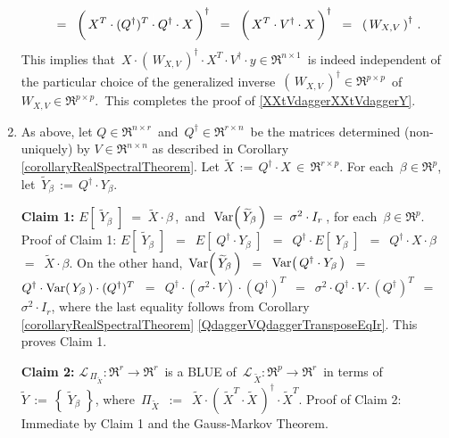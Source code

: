 \begin{enumerate}
\begin{equation*}
	\;\; = \;\;
	\left(\,X^{T} \cdot (Q^{\dagger})^{T} \overset{{\color{white}\vert}}{\cdot} Q^{\dagger} \cdot X\,\right)^{\dagger}
	\;\; = \;\;
	\left(\,X^{T} \overset{{\color{white}\vert}}{\cdot} V^{\dagger} \cdot X\,\right)^{\dagger}
	\;\; = \;\;
	\left(\,W_{X,V}\,\right)^{\dagger}\,.
	\end{equation*}
	This implies that
	\,$X \cdot \left(\,W_{X,V}\,\right)^{\dagger} \cdot X^{T} \cdot V^{\dagger} \cdot y \in \Re^{n \times 1}$\,
	is indeed independent of the particular choice of the generalized inverse
	\,$\left(\,W_{X,V}\,\right)^{\dagger} \in \Re^{p \times p}$\,
	of \,$W_{X,V} \in \Re^{p \times p}$.\,
	This completes the proof of \eqref{XXtVdaggerXXtVdaggerY}.
\item
	As above, let $Q \in \Re^{n \times r}$\, and \,$Q^{\dagger} \in \Re^{r \times n}$\,
	be the matrices determined (non-uniquely) by $V \in \Re^{n \times n}$
	as described in Corollary \ref{corollaryRealSpectralTheorem}.
	Let $\widetilde{X} \,:=\, Q^{\dagger} \cdot X \,\in\, \Re^{r \times p}$.
	For each \,$\beta \in \Re^{p}$,\, let \,$\widetilde{Y}_{\beta} \,:=\, Q^{\dagger} \cdot Y_{\beta}$.
	
	\vskip 0.5cm
	\noindent
	\textbf{Claim 1:}\quad
	$E\!\left[\;\widetilde{Y}_{\beta}\;\right] \; = \; \widetilde{X} \cdot \beta$\,,
	\,and\,
	\,$\textnormal{Var}\!\left(\,\widetilde{Y}_{\beta}\,\right) \; = \; \sigma^{2} \cdot I_{r}$\,,
	for each \,$\beta \in \Re^{p}$.
	\vskip 0.0cm
	\noindent
	Proof of Claim 1:\quad
	$E\!\left[\;\widetilde{Y}_{\beta}\;\right]$
	\,$=$\, $E\!\left[\;Q^{\dagger} \cdot Y_{\beta}\;\right]$
	\,$=$\, $Q^{\dagger} \cdot E\!\left[\;Y_{\beta}\;\right]$
	\,$=$\, $Q^{\dagger} \cdot X \cdot \beta$
	\,$=$\, $\widetilde{X} \cdot \beta$.
	On the other hand,
	\,$\textnormal{Var}\!\left(\,\widetilde{Y}_{\beta}\,\right)$
	\,$=$\, $\textnormal{Var}\!\left(\,Q^{\dagger} \cdot Y_{\beta}\,\right)$
	\,$=$\, $Q^{\dagger} \cdot \textnormal{Var}\!\left(\,Y_{\beta}\,\right) \cdot (Q^{\dagger})^{T}$
	\,$=$\, $Q^{\dagger} \cdot (\sigma^{2} \cdot V) \cdot (Q^{\dagger})^{T}$
	\,$=$\, $\sigma^{2} \cdot Q^{\dagger} \cdot V \cdot (Q^{\dagger})^{T}$
	\,$=$\, $\sigma^{2} \cdot I_{r}$,
	where the last equality follows from
	Corollary \ref{corollaryRealSpectralTheorem} \eqref{QdaggerVQdaggerTransposeEqIr}.
	This proves Claim 1.

	\vskip 0.5cm
	\noindent
	\textbf{Claim 2:}\quad
	$\mathcal{L}_{\,\Pi_{\widetilde{X}}} : \Re^{r} \longrightarrow \Re^{r}$\,
	is a BLUE of 
	\,$\mathcal{L}_{\,\widetilde{X}} : \Re^{p} \longrightarrow \Re^{r}$\,
	in terms of
	\,$\widetilde{Y} \,:=\, \left\{\;\widetilde{Y}_{\beta}\;\right\}$,
	where
	\,$\Pi_{\widetilde{X}}$
	\,$:=$\, $\widetilde{X} \cdot (\,\widetilde{X}^{T} \cdot \widetilde{X}\,)^{\dagger} \cdot \widetilde{X}^{T}$.
	\vskip 0.0cm
	\noindent
	Proof of Claim 2:\quad
	Immediate by Claim 1 and the Gauss-Markov Theorem.


\end{enumerate}

